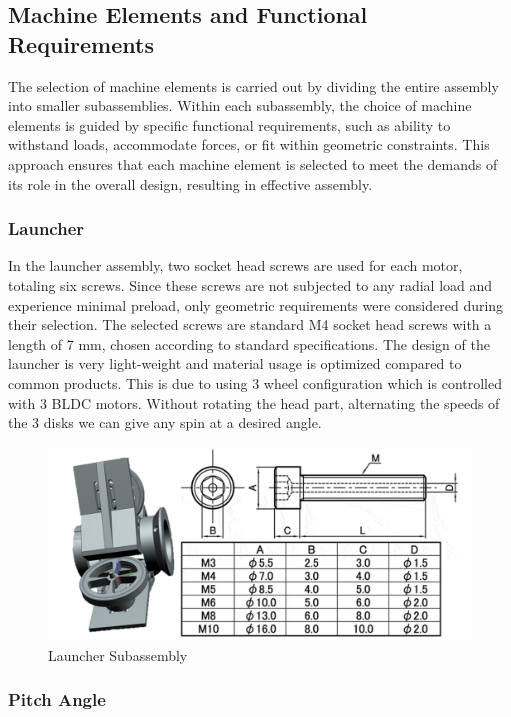 \documentclass[12pt]{report}
\begin{document}
\subsection{Machine Elements and Functional Requirements}

The selection of machine elements is carried out by dividing the entire assembly into smaller subassemblies. Within each subassembly, the choice of machine elements is guided by specific functional requirements, such as ability to withstand loads, accommodate forces, or fit within geometric constraints. This approach ensures that each machine element is selected to meet the demands of its role in the overall design, resulting in effective assembly.


\subsubsection{Launcher}

In the launcher assembly, two socket head screws are used for each motor, totaling six screws. Since these screws are not subjected to any radial load and experience minimal preload, only geometric requirements were considered during their selection. The selected screws are standard M4 socket head screws with a length of 7 mm, chosen according to standard specifications. The design of the launcher is very light-weight and material usage is optimized compared to common products. This is due to using 3 wheel configuration which is controlled with 3 BLDC motors. Without rotating the head part, alternating the speeds of the 3 disks we can give any spin at a desired angle.

\begin{figure}[h!]
    \centering
    \includegraphics[width=0.7\linewidth]{2.3.1.png}
    \caption{Launcher Subassembly}
    \label{fig:enter-label}
\end{figure}

\subsubsection{Pitch Angle}
\end{document}
